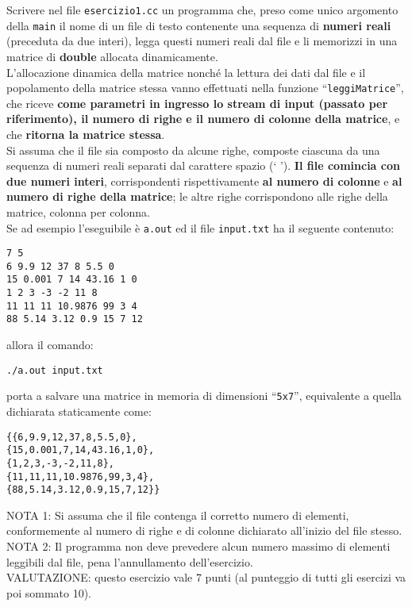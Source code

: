 
%

Scrivere nel file {\tt esercizio1.cc} un programma che, 
preso come unico argomento della \texttt{main} il nome di un file di testo
contenente una sequenza di \textbf{numeri reali} (preceduta da due interi),
legga questi numeri reali dal file
e li memorizzi in una matrice di \textbf{double} allocata dinamicamente.\\

L'allocazione dinamica della matrice nonch\'e la lettura dei dati dal file
e il popolamento della matrice stessa vanno effettuati nella funzione
``\texttt{leggiMatrice}'', che riceve \textbf{come parametri in ingresso
lo stream di input (passato per riferimento), il numero di righe
e il numero di colonne della matrice}, e che \textbf{ritorna la matrice stessa}.\\

Si assuma che il file sia composto da alcune righe, composte ciascuna
da una sequenza di numeri reali separati dal carattere spazio (` ').
\textbf{Il file comincia con due numeri interi}, corrispondenti rispettivamente
\textbf{al numero di colonne} e \textbf{al numero di righe della matrice};
le altre righe corrispondono alle righe della matrice, colonna per colonna.\\

\noindent
Se ad esempio l'eseguibile \`e \texttt{a.out} ed il file 
\texttt{input.txt} ha il seguente contenuto:
\begin{verbatim}
7 5
6 9.9 12 37 8 5.5 0
15 0.001 7 14 43.16 1 0
1 2 3 -3 -2 11 8
11 11 11 10.9876 99 3 4
88 5.14 3.12 0.9 15 7 12
\end{verbatim}
allora il comando:

\begin{verbatim}
./a.out input.txt
\end{verbatim}
\noindent
porta a salvare una matrice in memoria di dimensioni ``{\tt 5x7}'',
equivalente a quella dichiarata staticamente come:
\begin{verbatim}
{{6,9.9,12,37,8,5.5,0},
{15,0.001,7,14,43.16,1,0},
{1,2,3,-3,-2,11,8},
{11,11,11,10.9876,99,3,4},
{88,5.14,3.12,0.9,15,7,12}}
\end{verbatim}

\vspace{.3cm}

NOTA 1:
Si assuma che il file contenga il corretto numero di elementi,
conformemente al numero di righe e di colonne dichiarato
all'inizio del file stesso.\\

NOTA 2:
Il programma non deve prevedere alcun numero massimo di elementi 
leggibili dal file, pena l'annullamento dell'esercizio.\\

VALUTAZIONE:
questo esercizio vale 7 punti (al punteggio di tutti gli esercizi va poi sommato 10).

%
